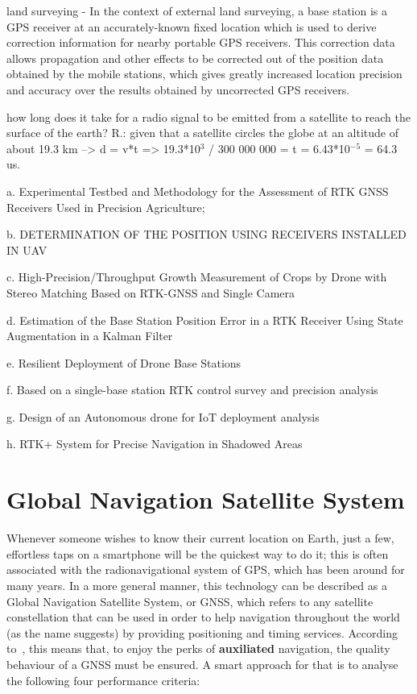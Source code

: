 \begin{itemize}
        land surveying - In the context of external land surveying, a base station is a GPS receiver at an accurately-known fixed location which is used to derive correction information for nearby portable GPS receivers. This correction data allows propagation and other effects to be corrected out of the position data obtained by the mobile stations, which gives greatly increased location precision and accuracy over the results obtained by uncorrected GPS receivers.

        how long does it take for a radio signal to be emitted from a satellite to reach the surface of the earth? 
        R.: given that a satellite circles the globe at an altitude of about 19.3 km --> d = v*t => 19.3*10$^3$ / 300 000 000 = t = 6.43*10$^{-5}$ = 64.3 us.

    a. Experimental Testbed and Methodology for the
    Assessment of RTK GNSS Receivers Used
    in Precision Agriculture;

    b. DETERMINATION OF THE POSITION USING
    RECEIVERS INSTALLED IN UAV

    c. High-Precision/Throughput Growth Measurement of
    Crops by Drone with Stereo Matching Based on
    RTK-GNSS and Single Camera

    d. Estimation of the Base Station Position Error in a
    RTK Receiver Using State Augmentation in a
    Kalman Filter

    e. Resilient Deployment of Drone Base Stations

    f. Based on a single-base station RTK control survey
    and precision analysis 

    g. Design of an Autonomous drone for IoT deployment
    analysis 

    h. RTK+ System for Precise Navigation in Shadowed
    Areas 
\end{itemize}

\section{Global Navigation Satellite System}\label{sec:II_gnss}

Whenever someone wishes to know their current location on Earth, just a few, effortless taps on a smartphone will be the quickest way to do it; this is often associated with the radionavigational system of GPS, which has been around for many years. In a more general manner, this technology can be described as a Global Navigation Satellite System, or GNSS, which refers to any satellite constellation that can be used in order to help navigation throughout the world (as the name suggests) by providing positioning and timing services. According to~\cite{fed_rad_plan_2008}, this means that, to enjoy the perks of \textbf{auxiliated} navigation, the quality behaviour of a GNSS must be ensured. A smart approach for that is to analyse the following four performance criteria:

